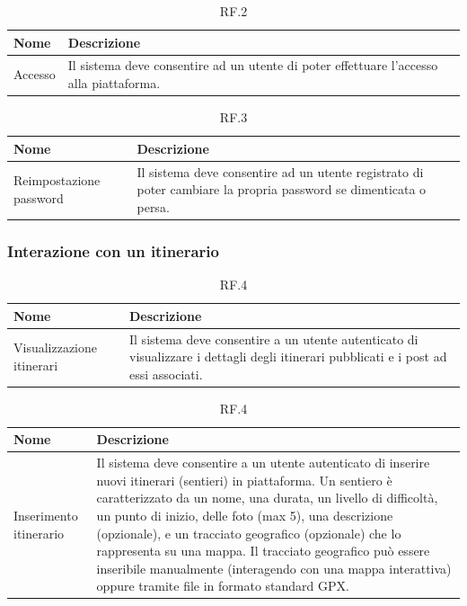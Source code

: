 \documentclass{natourDoc}
\begin{document}
	\begin{table}[H]
		\centering
		\begin{tabular}{ |p{5cm}|p{10.3cm}| } 
			\hline
			\rowcolor{PineGreen!70}
			\textbf{Nome} & \textbf{Descrizione} \\
			\hline
			Accesso & Il sistema deve consentire ad un utente di poter effettuare l'accesso alla piattaforma.\\ 
			\hline
		\end{tabular}
		\caption{RF.2}
		\label{table:2}
	\end{table}

	\begin{table}[H]
		\centering
		\begin{tabular}{ |p{5cm}|p{10.3cm}| } 
			\hline
			\rowcolor{PineGreen!70}
			\textbf{Nome} & \textbf{Descrizione} \\
			\hline
			Reimpostazione password & Il sistema deve consentire ad un utente registrato di poter cambiare la propria password se dimenticata o persa.\\ 
			\hline
		\end{tabular}
		\caption{RF.3}
		\label{table:3}
	\end{table}


	\subsubsection{Interazione con un itinerario}
	\begin{table}[H]
		\centering
		\begin{tabular}{ |p{5cm}|p{10.3cm}| }
			\hline
			\rowcolor{PineGreen!70}
			\textbf{Nome} & \textbf{Descrizione} \\
			\hline
			Visualizzazione itinerari & Il sistema deve consentire a un utente autenticato di visualizzare i
			dettagli degli itinerari pubblicati e i post ad essi associati. \\
			\hline
		\end{tabular}
		\caption{RF.4}
		\label{table:4}
	\end{table}

	\begin{table}[H]
		\centering
		\begin{tabular}{ |p{5cm}|p{10.3cm}| } 
			\hline
			\rowcolor{PineGreen!70}
			\textbf{Nome} & \textbf{Descrizione} \\
			\hline
			Inserimento itinerario &  Il sistema deve consentire a un utente autenticato di inserire nuovi itinerari (sentieri) in piattaforma. Un sentiero è
			caratterizzato da un nome, una durata, un livello di difficoltà, un punto di inizio, delle foto (max 5), una descrizione
			(opzionale), e un tracciato geografico (opzionale) che lo rappresenta su una mappa. Il tracciato
			geografico può essere inseribile manualmente (interagendo con una mappa interattiva) oppure
			tramite file in formato standard GPX.\\ 
			\hline
		\end{tabular}
		\caption{RF.4}
		\label{table:4}
	\end{table}
	
\end{document}
